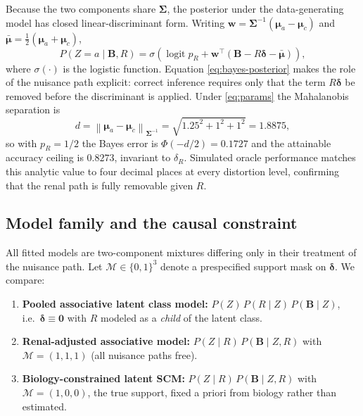 Because the two components share $\bm{\Sigma}$, the posterior under the
data-generating model has closed linear-discriminant form. Writing
$\mathbf{w} = \bm{\Sigma}^{-1}(\bm{\mu}_a - \bm{\mu}_c)$ and
$\bar{\bm{\mu}} = \tfrac{1}{2}(\bm{\mu}_a + \bm{\mu}_c)$,
\begin{equation}
  P(Z = a \mid \mathbf{B}, R)
    = \sigma\!\left(
        \operatorname{logit} p_R
        + \mathbf{w}^\top \left( \mathbf{B} - R\bm{\delta} - \bar{\bm{\mu}} \right)
      \right),
  \label{eq:bayes-posterior}
\end{equation}
where $\sigma(\cdot)$ is the logistic function. Equation
\eqref{eq:bayes-posterior} makes the role of the nuisance path explicit:
correct inference requires only that the term $R\bm{\delta}$ be removed
before the discriminant is applied. Under \eqref{eq:params} the
Mahalanobis separation is
\begin{equation}
  d = \left\| \bm{\mu}_a - \bm{\mu}_c \right\|_{\bm{\Sigma}^{-1}}
    = \sqrt{1.25^2 + 1^2 + 1^2} = 1.8875,
  \label{eq:separation}
\end{equation}
so with $p_R = 1/2$ the Bayes error is
$\Phi(-d/2) = 0.1727$ and the attainable accuracy ceiling is
$0.8273$, invariant to $\delta_R$. Simulated oracle performance matches
this analytic value to four decimal places at every distortion level,
confirming that the renal path is fully removable given $R$.

\subsection{Model family and the causal constraint}

All fitted models are two-component mixtures differing only in their
treatment of the nuisance path. Let $\mathcal{M} \in \{0,1\}^3$ denote a
prespecified support mask on $\bm{\delta}$. We compare:

\begin{enumerate}
  \item \textbf{Pooled associative latent class model:}
        $P(Z)\,P(R \mid Z)\,P(\mathbf{B} \mid Z)$, i.e.\ $\bm{\delta} \equiv \mathbf{0}$
        with $R$ modeled as a \emph{child} of the latent class.
  \item \textbf{Renal-adjusted associative model:}
        $P(Z \mid R)\,P(\mathbf{B} \mid Z, R)$ with $\mathcal{M} = (1,1,1)$
        (all nuisance paths free).
  \item \textbf{Biology-constrained latent SCM:}
        $P(Z \mid R)\,P(\mathbf{B} \mid Z, R)$ with $\mathcal{M} = (1,0,0)$,
        the true support, fixed a priori from biology rather than estimated.
\end{enumerate}

